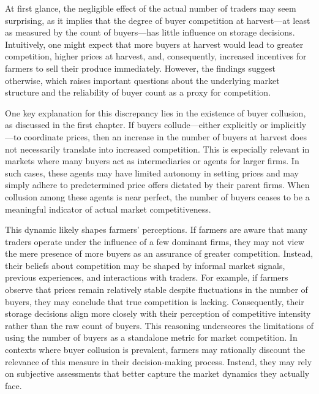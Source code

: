 \documentclass[12pt]{article}
\begin{document}
At first glance, the negligible effect of the actual number of traders may seem surprising, as it implies that the degree of buyer competition at harvest—at least as measured by the count of buyers—has little influence on storage decisions. Intuitively, one might expect that more buyers at harvest would lead to greater competition, higher prices at harvest, and, consequently, increased incentives for farmers to sell their produce immediately. However, the findings suggest otherwise, which raises important questions about the underlying market structure and the reliability of buyer count as a proxy for competition.

One key explanation for this discrepancy lies in the existence of buyer collusion, as discussed in the first chapter. If buyers collude—either explicitly or implicitly—to coordinate prices, then an increase in the number of buyers at harvest does not necessarily translate into increased competition. This is especially relevant in markets where many buyers act as intermediaries or agents for larger firms. In such cases, these agents may have limited autonomy in setting prices and may simply adhere to predetermined price offers dictated by their parent firms. When collusion among these agents is near perfect, the number of buyers ceases to be a meaningful indicator of actual market competitiveness.

This dynamic likely shapes farmers' perceptions. If farmers are aware that many traders operate under the influence of a few dominant firms, they may not view the mere presence of more buyers as an assurance of greater competition. Instead, their beliefs about competition may be shaped by informal market signals, previous experiences, and interactions with traders. For example, if farmers observe that prices remain relatively stable despite fluctuations in the number of buyers, they may conclude that true competition is lacking. Consequently, their storage decisions align more closely with their perception of competitive intensity rather than the raw count of buyers. This reasoning underscores the limitations of using the number of buyers as a standalone metric for market competition. In contexts where buyer collusion is prevalent, farmers may rationally discount the relevance of this measure in their decision-making process. Instead, they may rely on subjective assessments that better capture the market dynamics they actually face.
\end{document}
